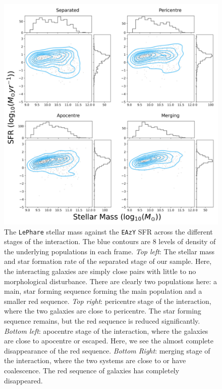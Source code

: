 \begin{figure}
\centering
\includegraphics[width = \textwidth]{Chapter3/figures/sfr-mass-stages.pdf}
\caption[The \texttt{LePhare} stellar mass against the \texttt{EAzY} SFR across the different stages of the interaction.]{The \texttt{LePhare} stellar mass against the \texttt{EAzY} SFR across the different stages of the interaction. The blue contours are 8 levels of density of the underlying populations in each frame. \textit{Top left}: The stellar mass and star formation rate of the separated stage of our sample. Here, the interacting galaxies are simply close pairs with little to no morphological disturbance. There are clearly two populations here: a main, star forming sequence forming the main population and a smaller red sequence. \textit{Top right}: pericentre stage of the interaction, where the two galaxies are close to pericentre. The star forming sequence remains, but the red sequence is reduced significantly. \textit{Bottom left}: apocentre stage of the interaction, where the galaxies are close to apocentre or escaped. Here, we see the almost complete disappearance of the red sequence. \textit{Bottom Right}: merging stage of the interaction, where the two systems are close to or have coalescence. The red sequence of galaxies has completely disappeared.}
\label{fig:sfr-mass}
\end{figure}

